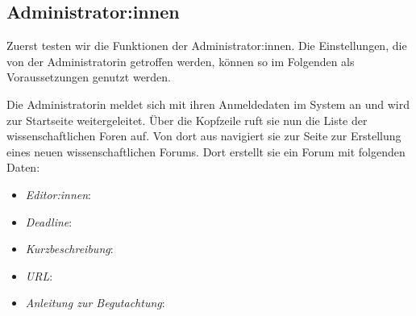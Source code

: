 \subsection{Administrator:innen}
Zuerst testen wir die Funktionen der Administrator:innen.
Die Einstellungen, die von der Administratorin getroffen werden, können so im Folgenden als Voraussetzungen genutzt werden.
\begin{description}
	 Die Administratorin meldet sich mit ihren Anmeldedaten im System an und wird zur Startseite weitergeleitet.
	Über die Kopfzeile ruft sie nun die Liste der wissenschaftlichen Foren auf.
	Von dort aus navigiert sie zur Seite zur Erstellung eines neuen wissenschaftlichen Forums.
	Dort erstellt sie ein Forum mit folgenden Daten:
	\begin{itemize}
		\item \emph{Editor:innen}:
		\item \emph{Deadline}:
		\item \emph{Kurzbeschreibung}:
		\item \emph{URL}:
		\item \emph{Anleitung zur Begutachtung}:
	\end{itemize}
\end{description}